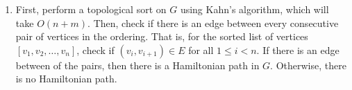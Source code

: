 \documentclass{article}
\begin{document}
\begin{solution}
\begin{enumerate}[label = (\alph*)]
    \item First, perform a topological sort on $G$ using Kahn's algorithm, which will take $O(n + m)$. Then, check if there is an edge between every consecutive pair of vertices in the ordering. That is, for the sorted list of vertices $[v_1, v_2, \ldots, v_n]$, check if $(v_i, v_{i+1}) \in E$ for all $1 \leq i < n$. If there is an edge between of the pairs, then there is a Hamiltonian path in $G$. Otherwise, there is no Hamiltonian path.
\end{enumerate}
\end{solution}
\end{document}
